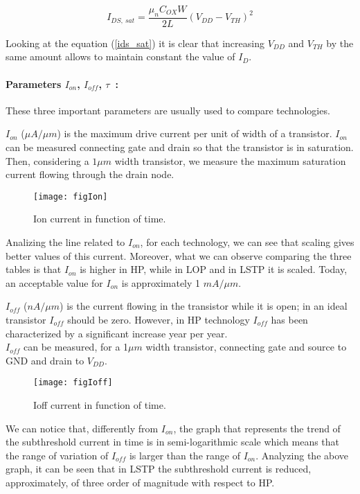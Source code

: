 \documentclass[a4paper, 12pt, twoside, openright]{report}
\begin{document}
\begin{equation}
I_{DS,\ sat} = \frac{\mu_n C_{OX} W}{2 L} (V_{DD} - V_{TH})^2
\label{ids_sat}
\end{equation}

Looking at the equation (\ref{ids_sat}) it is clear that increasing $V_{DD}$ and $V_{TH}$ by the same amount allows to maintain constant the value of $I_{D}$.



\paragraph{Parameters $I_{on}$, $I_{off}$, $\tau$~:} These three important parameters are usually used to compare technologies. 

$I_{on}$ ($\mu A/\mu m$) is the maximum drive current per unit of width of a transistor. $I_{on}$ can be measured connecting gate and drain so that the transistor is in saturation. Then, considering a $1 \mu m$ width transistor, we measure the maximum saturation current flowing through the drain node.

	\begin{figure}[h]
	\centering
	\texttt{[image: figIon]}
	\caption{Ion current in function of time.}
	\label{}
	\end{figure}

Analizing the line related to $I_{on}$, for each technology, we can see that scaling gives better values of this current. Moreover, what we can observe comparing the three tables is that $I_{on}$ is higher in HP, while in LOP and in LSTP it is scaled. Today, an acceptable value for $I_{on}$ is approximately 1 $mA/\mu m$.

$I_{off}$ ($nA/\mu m$) is the current flowing in the transistor while it is open; in an ideal transistor $I_{off}$ should be zero. However, in HP technology $I_{off}$ has been characterized by a significant increase year per year.\\
$I_{off}$ can be measured, for a 1$\mu m$ width transistor, connecting gate and source to GND and drain to $V_{DD}$.

	\begin{figure}[h]
	\centering
	\texttt{[image: figIoff]}
	\caption{Ioff current in function of time.}
	\label{}
	\end{figure}

We can notice that, differently from $I_{on}$, the graph that represents the trend of the subthreshold current in time is in semi-logarithmic scale which means that the range of variation of $I_{off}$ is larger than the range of $I_{on}$. Analyzing the above graph, it can be seen that in LSTP the subthreshold current is reduced, approximately, of three order of magnitude with respect to HP.
\end{document}
